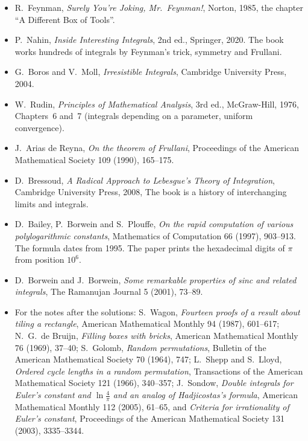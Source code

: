 \begin{itemize}
\item R.~Feynman, \emph{Surely You're Joking, Mr.~Feynman!}, Norton, 1985, the chapter ``A Different Box of Tools''.
\item P.~Nahin, \emph{Inside Interesting Integrals}, 2nd ed., Springer, 2020. The book works hundreds of integrals by Feynman's trick, symmetry and Frullani.
\item G.~Boros and V.~Moll, \emph{Irresistible Integrals}, Cambridge University Press, 2004.
\item W.~Rudin, \emph{Principles of Mathematical Analysis}, 3rd ed., McGraw-Hill, 1976, Chapters~6 and~7 (integrals depending
on a parameter, uniform convergence).
\item J.~Arias de Reyna, \emph{On the theorem of Frullani}, Proceedings of the American Mathematical Society 109 (1990),
165--175.
\item D.~Bressoud, \emph{A Radical Approach to Lebesgue's Theory of Integration}, Cambridge University Press, 2008, The book is a history of interchanging limits and integrals.
\item D.~Bailey, P.~Borwein and S.~Plouffe, \emph{On the rapid computation of various polylogarithmic constants}, Mathematics of Computation 66 (1997),
903--913. The formula dates from 1995. The paper prints the hexadecimal digits of $\pi$ from position $10^6$.
\item D.~Borwein and J.~Borwein, \emph{Some remarkable properties of sinc and related integrals}, The Ramanujan Journal 5 (2001), 73--89.
\item For the notes after the solutions: S.~Wagon, \emph{Fourteen proofs of a result about tiling a rectangle}, American Mathematical Monthly 94 (1987),
601--617; N.~G.~de Bruijn, \emph{Filling boxes with bricks}, American Mathematical Monthly 76 (1969), 37--40; S.~Golomb, \emph{Random permutations}, Bulletin of
the American Mathematical Society 70 (1964), 747; L.~Shepp and S.~Lloyd, \emph{Ordered cycle lengths in a random permutation}, Transactions of the American
Mathematical Society 121 (1966), 340--357; J.~Sondow, \emph{Double integrals for Euler's constant and $\ln\frac4\pi$ and an analog of Hadjicostas's formula},
American Mathematical Monthly 112 (2005), 61--65, and \emph{Criteria for irrationality of Euler's constant}, Proceedings of the American Mathematical Society
131 (2003), 3335--3344.
\end{itemize}
